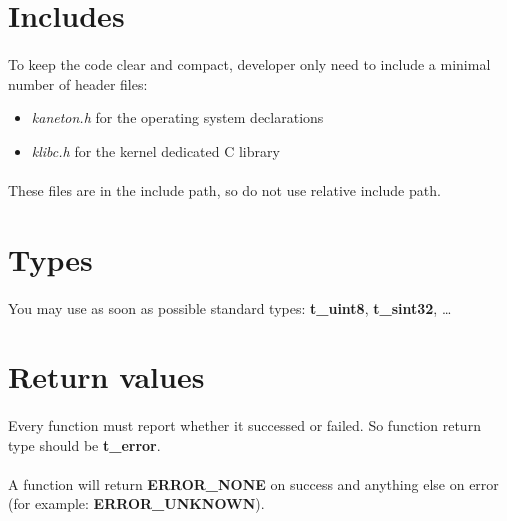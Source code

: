 \section*{Includes}

\paragraph{}
To keep the  code clear and compact, developer only  need to include a
minimal number of header files:

\begin{itemize}
\item \textit{kaneton.h} for the operating system declarations
\item \textit{klibc.h} for the kernel dedicated C library
\end{itemize}

\paragraph{}
These files  are in the include  path, so do not  use relative include
path.

\section*{Types}

\paragraph{}
You  may use  as  soon as  possible  standard types:  \textbf{t\_uint8},
\textbf{t\_sint32}, \ldots{}

\section*{Return values}

\paragraph{}
Every function must report whether it successed or failed. So function
return type should be \textbf{t\_error}.

\paragraph{}
A function  will return  \textbf{ERROR\_NONE} on success  and anything
else on error (for example: \textbf{ERROR\_UNKNOWN}).

